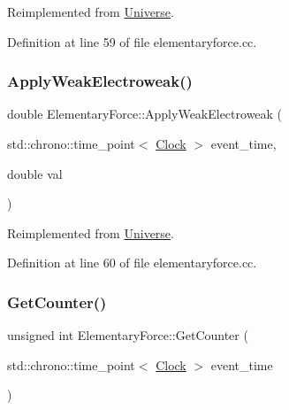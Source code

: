 Reimplemented from \mbox{\hyperlink{class_universe_a6d1226b3adec3c42a833afdbb6a65a92}{Universe}}.



Definition at line 59 of file elementaryforce.\+cc.

\mbox{\label{class_elementary_force_a2d3a5444c771f35d66d4151c62f53b12}} 
\subsubsection{\texorpdfstring{Apply\+Weak\+Electroweak()}{ApplyWeakElectroweak()}}
{\footnotesize\ttfamily double Elementary\+Force\+::\+Apply\+Weak\+Electroweak (\begin{DoxyParamCaption}\item[{std\+::chrono\+::time\+\_\+point$<$ \mbox{\hyperlink{universe_8h_a0ef8d951d1ca5ab3cfaf7ab4c7a6fd80}{Clock}} $>$}]{event\+\_\+time,  }\item[{double}]{val }\end{DoxyParamCaption})\hspace{0.3cm}{\ttfamily [virtual]}}



Reimplemented from \mbox{\hyperlink{class_universe_a46a906baabb63e5d31f8b48ea1fae52e}{Universe}}.



Definition at line 60 of file elementaryforce.\+cc.

\mbox{\label{class_elementary_force_a466c37c769c1826bd0f416f38bb09996}} 
\subsubsection{\texorpdfstring{Get\+Counter()}{GetCounter()}}
{\footnotesize\ttfamily unsigned int Elementary\+Force\+::\+Get\+Counter (\begin{DoxyParamCaption}\item[{std\+::chrono\+::time\+\_\+point$<$ \mbox{\hyperlink{universe_8h_a0ef8d951d1ca5ab3cfaf7ab4c7a6fd80}{Clock}} $>$}]{event\+\_\+time }\end{DoxyParamCaption})}



